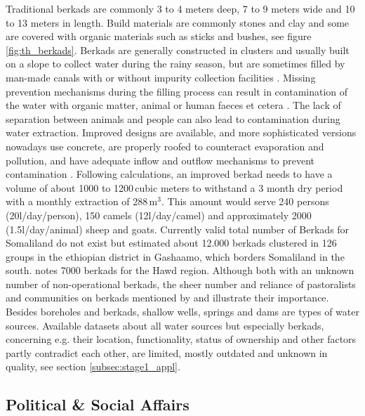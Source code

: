 Traditional berkads are commonly 3 to 4 meters deep, 7 to 9 meters wide and 10 to 13 meters in length. Build materials are commonly stones and clay and some are covered with organic materials such as sticks and bushes, see figure \ref{fig:th_berkads}. Berkads are generally constructed in clusters and usually built on a slope to collect water during the rainy season, but are sometimes filled by man-made canals with or without impurity collection facilities \autocite{walkerChangingPastoralismEthiopian1998}. Missing prevention mechanisms during the filling process can result in contamination of the water with organic matter, animal or human faeces et cetera \autocite{mercycorpsImprovedBerkadDesigns2017}. The lack of separation between animals and people can also lead to contamination during water extraction. Improved designs are available, and more sophisticated versions nowadays use concrete, are properly roofed to counteract evaporation and pollution, and have adequate inflow and outflow mechanisms to prevent contamination \autocite{mercycorpsImprovedBerkadDesigns2017, petrucciLandscapeLandformsNorthern2022}. Following \autocite{mercycorpsImprovedBerkadDesigns2017} calculations, an improved berkad needs to have a volume of about 1000 to 1200\,cubic meters to withstand a 3 month dry period with a monthly extraction of 288\,m$^3$. This amount would serve 240 persons (20l/day/person), 150 camels (12l/day/camel) and approximately 2000 (1.5l/day/animal) sheep and goats. Currently valid total number of Berkads for Somaliland do not exist but \autocite{walkerChangingPastoralismEthiopian1998} estimated about 12.000 berkads clustered in 126 groups in the ethiopian district in Gashaamo, which borders Somaliland in the south. \autocite{birchSomalilandSomaliRegion2008} notes 7000 berkads for the Hawd region. Although both with an unknown number of non-operational berkads, the sheer number and reliance of pastoralists and communities on berkads mentioned by \autocite{walkerChangingPastoralismEthiopian1998} and \autocite{birchSomalilandSomaliRegion2008} illustrate their importance. Besides boreholes and berkads, shallow wells, springs and dams are types of water sources. Available datasets about all water sources but especially berkads, concerning e.g. their location, functionality, status of ownership and other factors partly contradict each other, are limited, mostly outdated and unknown in quality, see section \ref{subsec:stage1_appl}\autocite{swalimSomaliaWaterSources}. 

\subsection{Political \& Social Affairs}

